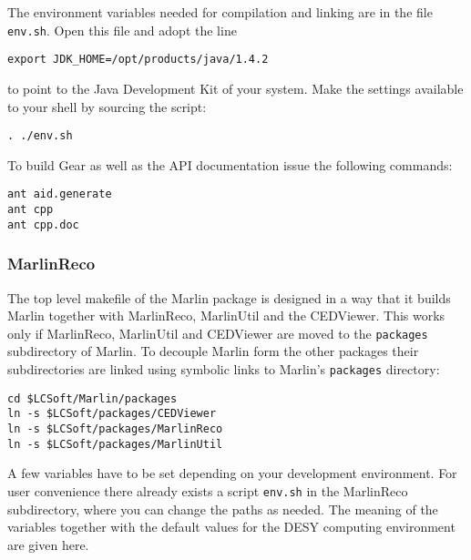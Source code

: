 The environment variables needed for compilation and linking are in the file
{\tt env.sh}. Open this file and adopt the line

\begin{verbatim}
export JDK_HOME=/opt/products/java/1.4.2
\end{verbatim}

to point to the Java Development Kit of your system.
Make the settings available to your shell by sourcing the script:

\begin{verbatim}
. ./env.sh
\end{verbatim}

To build Gear as well as the API documentation
issue the following commands:

\begin{verbatim}
ant aid.generate
ant cpp
ant cpp.doc
\end{verbatim}

\subsubsection*{MarlinReco}

The top level makefile of the Marlin package is designed in a way that it
builds Marlin together with MarlinReco, MarlinUtil and the CEDViewer.
This works only if MarlinReco, MarlinUtil and CEDViewer are moved to the
{\tt packages} subdirectory of Marlin. To decouple Marlin form the
other packages their subdirectories are linked using symbolic links to
Marlin's {\tt packages} directory:

\begin{verbatim}
cd $LCSoft/Marlin/packages
ln -s $LCSoft/packages/CEDViewer
ln -s $LCSoft/packages/MarlinReco
ln -s $LCSoft/packages/MarlinUtil
\end{verbatim}

A few variables have to be set depending on your development
environment. For user convenience there already exists a script
{\tt env.sh} in the MarlinReco subdirectory, where you can change
the paths as needed. The meaning of the variables together with the
default values for the DESY computing environment are given here.

